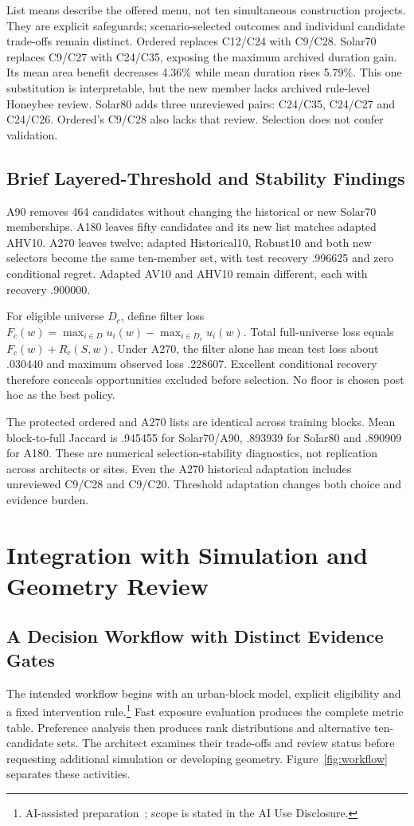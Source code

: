 \documentclass{llncs}
\newcommand{\aidraft}{\footnote{AI-assisted preparation~\cite{openai2026}; scope is stated in the AI Use Disclosure.}}
\begin{document}
List means describe the offered menu, not ten simultaneous construction projects. They are explicit safeguards; scenario-selected outcomes and individual candidate trade-offs remain distinct. Ordered replaces C12/C24 with C9/C28. Solar70 replaces C9/C27 with C24/C35, exposing the maximum archived duration gain. Its mean area benefit decreases 4.36\% while mean duration rises 5.79\%. This one substitution is interpretable, but the new member lacks archived rule-level Honeybee review. Solar80 adds three unreviewed pairs: C24/C35, C24/C27 and C24/C26. Ordered's C9/C28 also lacks that review. Selection does not confer validation.

\subsection{Brief Layered-Threshold and Stability Findings}
A90 removes 464 candidates without changing the historical or new Solar70 memberships. A180 leaves fifty candidates and its new list matches adapted AHV10. A270 leaves twelve; adapted Historical10, Robust10 and both new selectors become the same ten-member set, with test recovery .996625 and zero conditional regret. Adapted AV10 and AHV10 remain different, each with recovery .900000.

For eligible universe $D_c$, define filter loss $F_c(w)=\max_{i\in D}u_i(w)-\max_{i\in D_c}u_i(w)$. Total full-universe loss equals $F_c(w)+R_c(S,w)$. Under A270, the filter alone has mean test loss about .030440 and maximum observed loss .228607. Excellent conditional recovery therefore conceals opportunities excluded before selection. No floor is chosen post hoc as the best policy.

The protected ordered and A270 lists are identical across training blocks. Mean block-to-full Jaccard is .945455 for Solar70/A90, .893939 for Solar80 and .890909 for A180. These are numerical selection-stability diagnostics, not replication across architects or sites. Even the A270 historical adaptation includes unreviewed C9/C28 and C9/C20. Threshold adaptation changes both choice and evidence burden.

\section{Integration with Simulation and Geometry Review}
\subsection{A Decision Workflow with Distinct Evidence Gates}
The intended workflow begins with an urban-block model, explicit eligibility and a fixed intervention rule.\aidraft{} Fast exposure evaluation produces the complete metric table. Preference analysis then produces rank distributions and alternative ten-candidate sets. The architect examines their trade-offs and review status before requesting additional simulation or developing geometry. Figure~\ref{fig:workflow} separates these activities.
\end{document}
